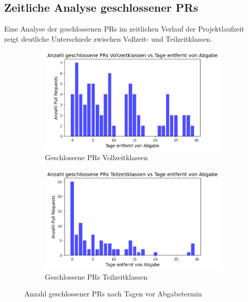 \subsection{Zeitliche Analyse geschlossener PRs}

Eine Analyse der geschlossenen PRs im zeitlichen Verlauf der Projektlaufzeit zeigt deutliche Unterschiede zwischen Vollzeit- und Teilzeitklassen.

\begin{figure}[htbp] 
\centering \begin{subfigure}[b]{0.48\textwidth} 
\centering \includegraphics[width=\textwidth]{Figures/closed-prs-projektzeit-vollzeit.png} 
\caption{Geschlossene PRs Vollzeitklassen} 
\label{fig:closed-prs-projektkeit-vollzeit}
\end{subfigure} 
\hfill 
\begin{subfigure}[b]{0.48\textwidth} 
\centering \includegraphics[width=\textwidth]{Figures/closed-prs-projektzeit-teilzeit.png} 
\caption{Geschlossene PRs Teilzeitklassen} 
\label{fig:closed-prs-projektkeit-teilzeit} 
\end{subfigure} 
\caption{Anzahl geschlossener PRs nach Tagen vor Abgabetermin} 
\label{fig:closed-prs-projektzeit} 
\end{figure}

